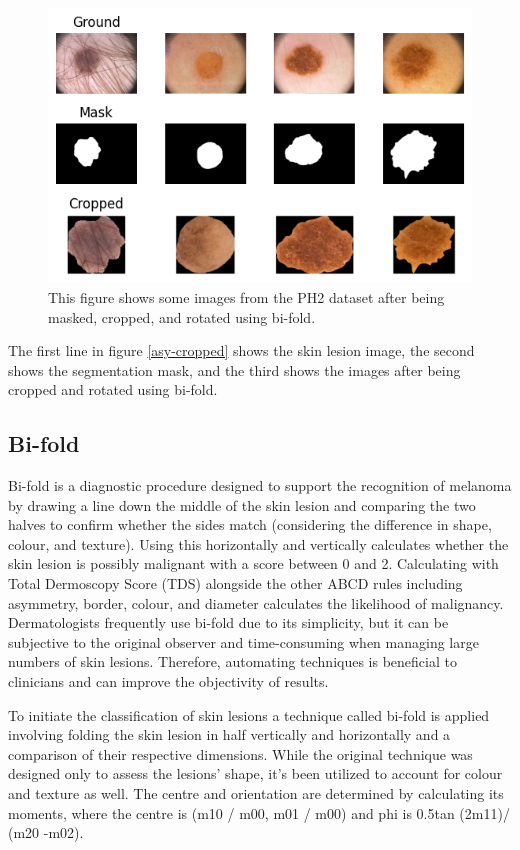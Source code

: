 \begin{figure}
    \centering
    \includegraphics[scale=1.2]{images/asymmetry/asy-cropped.png}
    \caption{This figure shows some images from the PH2 dataset after being masked, cropped, and rotated using bi-fold.} 
\end{figure}\label{asy-cropped}

The first line in figure \ref{asy-cropped} shows the skin lesion image, the second shows the segmentation mask, and the third shows the images after being cropped and rotated using bi-fold.

\subsection{Bi-fold}
Bi-fold is a diagnostic procedure designed to support the recognition of melanoma by drawing a line down the middle of the skin lesion and comparing the two halves to confirm whether the sides match (considering the difference in shape, colour, and texture). Using this horizontally and vertically calculates whether the skin lesion is possibly malignant with a score between 0 and 2. Calculating with Total Dermoscopy Score (TDS) alongside the other ABCD rules including asymmetry, border, colour, and diameter calculates the likelihood of malignancy. Dermatologists frequently use bi-fold due to its simplicity, but it can be subjective to the original observer and time-consuming when managing large numbers of skin lesions. Therefore, automating techniques is beneficial to clinicians and can improve the objectivity of results.

To initiate the classification of skin lesions a technique called bi-fold is applied involving folding the skin lesion in half vertically and horizontally and a comparison of their respective dimensions. While the original technique was designed only to assess the lesions' shape, it's been utilized to account for colour and texture as well. The centre and orientation are determined by calculating its moments, where the centre is (m10 / m00, m01 / m00) and phi is 0.5tan (2m11)/ (m20 -m02).

